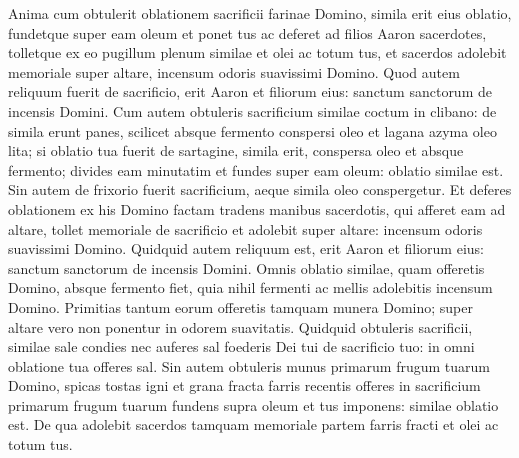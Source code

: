 \begin{biblechapter}  
\verse Anima cum obtulerit oblationem sacrificii farinae Domino, simila erit eius oblatio, fundetque super eam oleum et ponet tus 
\verse ac deferet ad filios Aaron sacerdotes, tolletque ex eo pugillum plenum similae et olei ac totum tus, et sacerdos adolebit memoriale super altare, incensum odoris suavissimi Domino. 
\verse Quod autem reliquum fuerit de sacrificio, erit Aaron et filiorum eius: sanctum sanctorum de incensis Domini. 
\verse Cum autem obtuleris sacrificium similae coctum in clibano: de simila erunt panes, scilicet absque fermento conspersi oleo et lagana azyma oleo lita; 
\verse si oblatio tua fuerit de sartagine, simila erit, conspersa oleo et absque fermento; 
\verse divides eam minutatim et fundes super eam oleum: oblatio similae est.  
\verse Sin autem de frixorio fuerit sacrificium, aeque simila oleo conspergetur.  
\verse Et deferes oblationem ex his Domino factam tradens manibus sacerdotis, 
\verse qui afferet eam ad altare, tollet memoriale de sacrificio et adolebit super altare: incensum odoris suavissimi Domino. 
\verse Quidquid autem reliquum est, erit Aaron et filiorum eius: sanctum sanctorum de incensis Domini. 
\verse Omnis oblatio similae, quam offeretis Domino, absque fermento fiet, quia nihil fermenti ac mellis adolebitis incensum Domino. 
\verse Primitias tantum eorum offeretis tamquam munera Domino; super altare vero non ponentur in odorem suavitatis. 
\verse Quidquid obtuleris sacrificii, similae sale condies nec auferes sal foederis Dei tui de sacrificio tuo: in omni oblatione tua offeres sal. 
\verse Sin autem obtuleris munus primarum frugum tuarum Domino, spicas tostas igni et grana fracta farris recentis offeres in sacrificium primarum frugum tuarum  
\verse fundens supra oleum et tus imponens: similae oblatio est. 
\verse De qua adolebit sacerdos tamquam memoriale partem farris fracti et olei ac totum tus. 
\end{biblechapter}

